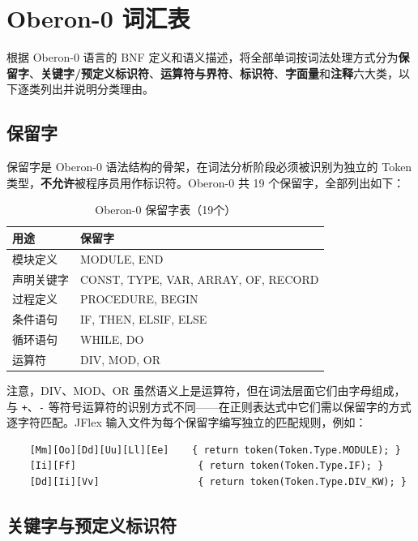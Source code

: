 \section{Oberon-0 词汇表}

根据 Oberon-0 语言的 BNF 定义和语义描述，将全部单词按词法处理方式分为\textbf{保留字}、\textbf{关键字/预定义标识符}、\textbf{运算符与界符}、\textbf{标识符}、\textbf{字面量}和\textbf{注释}六大类，以下逐类列出并说明分类理由。

\subsection{保留字}

保留字是 Oberon-0 语法结构的骨架，在词法分析阶段必须被识别为独立的 Token 类型，\textbf{不允许}被程序员用作标识符。Oberon-0 共 19 个保留字，全部列出如下：

\begin{table}[htbp]
    \centering
    \begin{tabular}{|l|l|}
    \hline
    \textbf{用途} & \textbf{保留字} \\
    \hline
    模块定义 & MODULE, END \\
    声明关键字 & CONST, TYPE, VAR, ARRAY, OF, RECORD \\
    过程定义 & PROCEDURE, BEGIN \\
    条件语句 & IF, THEN, ELSIF, ELSE \\
    循环语句 & WHILE, DO \\
    运算符 & DIV, MOD, OR \\
    \hline
    \end{tabular}
    \caption{Oberon-0 保留字表（19个）}
    \label{tab:reserved-words}
\end{table}

注意，DIV、MOD、OR 虽然语义上是运算符，但在词法层面它们由字母组成，与 \texttt{+}、\texttt{-} 等符号运算符的识别方式不同——在正则表达式中它们需以保留字的方式逐字符匹配。JFlex 输入文件为每个保留字编写独立的匹配规则，例如：

\begin{verbatim}
    [Mm][Oo][Dd][Uu][Ll][Ee]    { return token(Token.Type.MODULE); }
    [Ii][Ff]                     { return token(Token.Type.IF); }
    [Dd][Ii][Vv]                 { return token(Token.Type.DIV_KW); }
\end{verbatim}

\subsection{关键字与预定义标识符}

